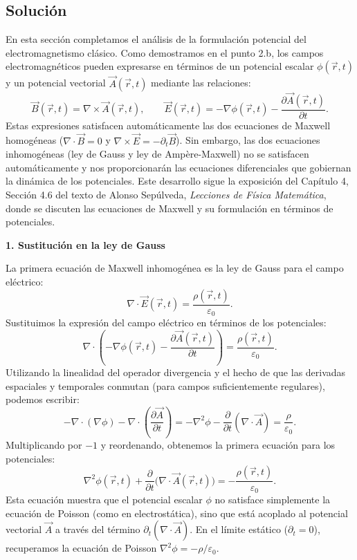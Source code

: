 \documentclass[a4paper]{article}
\begin{document}
\subsection{Solución}
En esta sección completamos el análisis de la formulación potencial del electromagnetismo clásico. Como demostramos en el punto 2.b, los campos electromagnéticos pueden expresarse en términos de un potencial escalar $\phi(\vec{r},t)$ y un potencial vectorial $\vec{A}(\vec{r},t)$ mediante las relaciones:
$$
\vec{B}(\vec{r},t) = \nabla \times \vec{A}(\vec{r},t), \qquad \vec{E}(\vec{r},t) = -\nabla\phi(\vec{r},t) - \frac{\partial \vec{A}(\vec{r},t)}{\partial t}.
$$
Estas expresiones satisfacen automáticamente las dos ecuaciones de Maxwell homogéneas ($\nabla \cdot \vec{B} = 0$ y $\nabla \times \vec{E} = -\partial_t \vec{B}$). Sin embargo, las dos ecuaciones inhomogéneas (ley de Gauss y ley de Ampère-Maxwell) no se satisfacen automáticamente y nos proporcionarán las ecuaciones diferenciales que gobiernan la dinámica de los potenciales. Este desarrollo sigue la exposición del Capítulo 4, Sección 4.6 del texto de Alonso Sepúlveda, \textit{Lecciones de Física Matemática}, donde se discuten las ecuaciones de Maxwell y su formulación en términos de potenciales.

\vspace{0.3cm}
\noindent\textbf{1. Sustitución en la ley de Gauss}

La primera ecuación de Maxwell inhomogénea es la ley de Gauss para el campo eléctrico:
$$
\nabla \cdot \vec{E}(\vec{r},t) = \frac{\rho(\vec{r},t)}{\varepsilon_0}.
$$
Sustituimos la expresión del campo eléctrico en términos de los potenciales:
$$
\nabla \cdot \left(-\nabla\phi(\vec{r},t) - \frac{\partial \vec{A}(\vec{r},t)}{\partial t}\right) = \frac{\rho(\vec{r},t)}{\varepsilon_0}.
$$
Utilizando la linealidad del operador divergencia y el hecho de que las derivadas espaciales y temporales conmutan (para campos suficientemente regulares), podemos escribir:
$$
-\nabla \cdot (\nabla\phi) - \nabla \cdot \left(\frac{\partial \vec{A}}{\partial t}\right) = -\nabla^2\phi - \frac{\partial}{\partial t}(\nabla \cdot \vec{A}) = \frac{\rho}{\varepsilon_0}.
$$
Multiplicando por $-1$ y reordenando, obtenemos la primera ecuación para los potenciales:
$$
\boxed{\nabla^2\phi(\vec{r},t) + \frac{\partial}{\partial t}\big(\nabla \cdot \vec{A}(\vec{r},t)\big) = -\frac{\rho(\vec{r},t)}{\varepsilon_0}}.
$$
Esta ecuación muestra que el potencial escalar $\phi$ no satisface simplemente la ecuación de Poisson (como en electrostática), sino que está acoplado al potencial vectorial $\vec{A}$ a través del término $\partial_t(\nabla \cdot \vec{A})$. En el límite estático ($\partial_t = 0$), recuperamos la ecuación de Poisson $\nabla^2\phi = -\rho/\varepsilon_0$.
\end{document}
